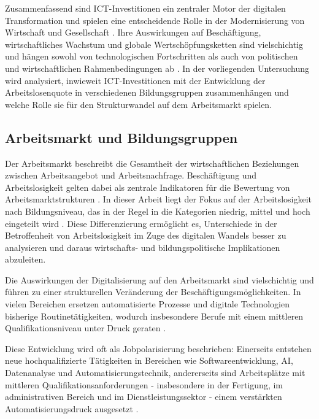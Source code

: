 Zusammenfassend sind \ac{ICT}-Investitionen ein zentraler Motor der digitalen 
Transformation und spielen eine entscheidende Rolle in der Modernisierung von Wirtschaft 
und Gesellschaft \parencite[S. 112]{brynjolfsson2015thesecond}. Ihre Auswirkungen auf 
Beschäftigung, wirtschaftliches Wachstum und globale Wertschöpfungsketten sind 
vielschichtig und hängen sowohl von technologischen Fortschritten als auch von politischen 
und wirtschaftlichen Rahmenbedingungen ab \parencite[S. 112]{brynjolfsson2015thesecond}. 
In der vorliegenden Untersuchung wird analysiert, inwieweit \ac{ICT}-Investitionen mit der 
Entwicklung der Arbeitslosenquote in verschiedenen Bildungsgruppen zusammenhängen und 
welche Rolle sie für den Strukturwandel auf dem Arbeitsmarkt spielen.


\subsection{Arbeitsmarkt und Bildungsgruppen}

Der Arbeitsmarkt beschreibt die Gesamtheit der wirtschaftlichen Beziehungen zwischen 
Arbeitsangebot und Arbeitsnachfrage. Beschäftigung und Arbeitslosigkeit gelten dabei als 
zentrale Indikatoren für die Bewertung von Arbeitsmarktstrukturen 
\parencite[S. 10ff]{acemoglu2002technical}. In dieser Arbeit liegt der Fokus auf der 
Arbeitslosigkeit nach Bildungsniveau, das in der Regel in die Kategorien niedrig, mittel 
und hoch eingeteilt wird \parencite[S. 35–37]{frey2016thefuture}. Diese Differenzierung 
ermöglicht es, Unterschiede in der Betroffenheit von Arbeitslosigkeit im Zuge des 
digitalen Wandels besser zu analysieren und daraus wirtschafts- und bildungspolitische 
Implikationen abzuleiten.

Die Auswirkungen der Digitalisierung auf den Arbeitsmarkt sind vielschichtig und führen zu 
einer strukturellen Veränderung der Beschäftigungsmöglichkeiten. In vielen Bereichen 
ersetzen automatisierte Prozesse und digitale Technologien bisherige Routinetätigkeiten, 
wodurch insbesondere Berufe mit einem mittleren Qualifikationsniveau unter Druck geraten 
\parencite[S. 44f]{frey2016thefuture}.

Diese Entwicklung wird oft als Jobpolarisierung beschrieben: Einerseits entstehen neue 
hochqualifizierte Tätigkeiten in Bereichen wie Softwareentwicklung, \ac{AI}, Datenanalyse 
und Automatisierungstechnik, andererseits sind Arbeitsplätze mit mittleren 
Qualifikationsanforderungen - insbesondere in der Fertigung, im administrativen Bereich 
und im Dienstleistungssektor - einem verstärkten Automatisierungsdruck ausgesetzt 
\parencite[S. 40]{autor2015whyare}.

